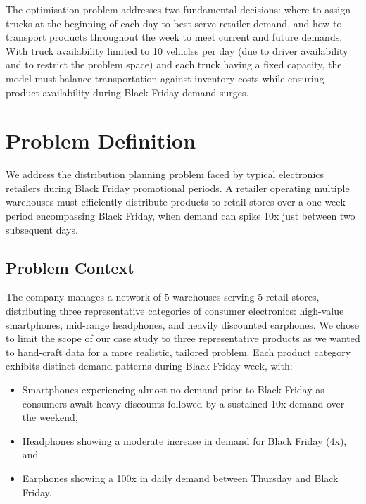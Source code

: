 \documentclass[a4paper,12pt]{article}
\begin{document}
The optimisation problem addresses two fundamental decisions: where to assign trucks at the beginning of each day to best serve retailer demand, and how to transport products throughout the week to meet current and future demands.
With truck availability limited to 10 vehicles per day (due to driver availability and to restrict the problem space) and each truck having a fixed capacity, the model must balance transportation against inventory costs while ensuring product availability during Black Friday demand surges.



\section{Problem Definition}\label{sec:problem-definition}

We address the distribution planning problem faced by typical electronics retailers during Black Friday promotional periods.
A retailer operating multiple warehouses must efficiently distribute products to retail stores over a one-week period encompassing Black Friday, when demand can spike 10x just between two subsequent days.

\subsection{Problem Context}\label{subsec:problem-context}

The company manages a network of 5 warehouses serving 5 retail stores, distributing three representative categories of consumer electronics: high-value smartphones, mid-range headphones, and heavily discounted earphones.
We chose to limit the scope of our case study to three representative products as we wanted to hand-craft data for a more realistic, tailored problem.
Each product category exhibits distinct demand patterns during Black Friday week, with:

\begin{itemize}
    \item Smartphones experiencing almost no demand prior to Black Friday as consumers await heavy discounts followed by a sustained 10x demand over the weekend,
    \item Headphones showing a moderate increase in demand for Black Friday (4x), and
    \item Earphones showing a 100x in daily demand between Thursday and Black Friday.
\end{itemize}
\end{document}
